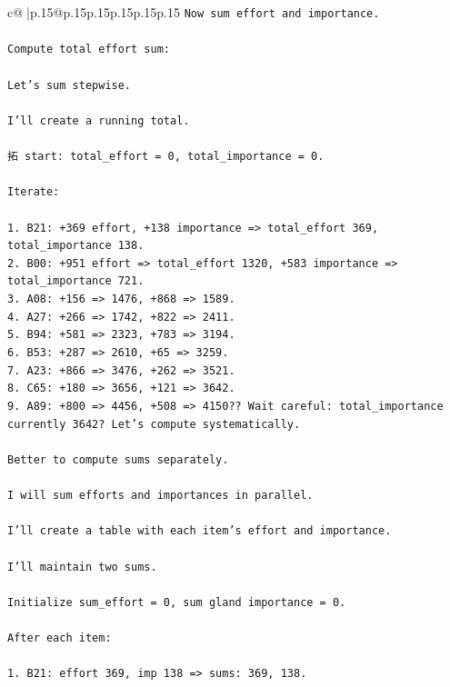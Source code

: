 \documentclass{article}
\begin{document}
{\begin{supertabular}{c@{$\;$}|p{.15\linewidth}@{}p{.15\linewidth}p{.15\linewidth}p{.15\linewidth}p{.15\linewidth}p{.15\linewidth}}
{{{\texttt{Now sum effort and importance.} \\
\\ 
\texttt{Compute total effort sum:} \\
\\ 
\texttt{Let's sum stepwise.} \\
\\ 
\texttt{I'll create a running total.} \\
\\ 
\texttt{拓 start: total\_effort = 0, total\_importance = 0.} \\
\\ 
\texttt{Iterate:} \\
\\ 
\texttt{1. B21: +369 effort, +138 importance => total\_effort 369, total\_importance 138.} \\
\texttt{2. B00: +951 effort => total\_effort 1320, +583 importance => total\_importance 721.} \\
\texttt{3. A08: +156 => 1476, +868 => 1589.} \\
\texttt{4. A27: +266 => 1742, +822 => 2411.} \\
\texttt{5. B94: +581 => 2323, +783 => 3194.} \\
\texttt{6. B53: +287 => 2610, +65 => 3259.} \\
\texttt{7. A23: +866 => 3476, +262 => 3521.} \\
\texttt{8. C65: +180 => 3656, +121 => 3642.} \\
\texttt{9. A89: +800 => 4456, +508 => 4150?? Wait careful: total\_importance currently 3642? Let's compute systematically.} \\
\\ 
\texttt{Better to compute sums separately.} \\
\\ 
\texttt{I will sum efforts and importances in parallel.} \\
\\ 
\texttt{I'll create a table with each item's effort and importance.} \\
\\ 
\texttt{I'll maintain two sums.} \\
\\ 
\texttt{Initialize sum\_effort = 0, sum gland importance = 0.} \\
\\ 
\texttt{After each item:} \\
\\ 
\texttt{1. B21: effort 369, imp 138 => sums: 369, 138.} \\
}}}
\end{supertabular}}
\end{document}

